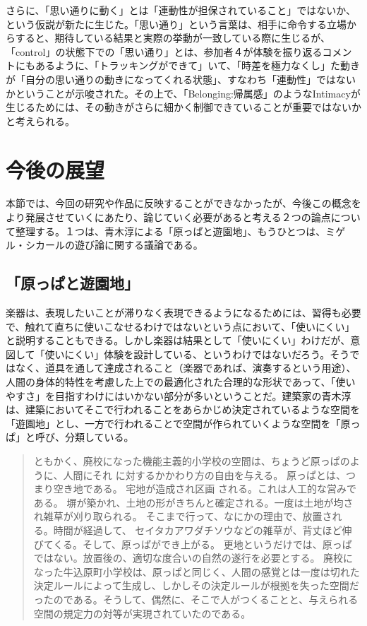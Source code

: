 さらに、「思い通りに動く」とは「連動性が担保されていること」ではないか、という仮説が新たに生じた。「思い通り」という言葉は、相手に命令する立場からすると、期待している結果と実際の挙動が一致している際に生じるが、「control」の状態下での「思い通り」とは、参加者４が体験を振り返るコメントにもあるように、「トラッキングができて」いて、「時差を極力なくし」た動きが「自分の思い通りの動きになってくれる状態」、すなわち「連動性」ではないかということが示唆された。その上で、「Belonging:帰属感」のようなIntimacyが生じるためには、その動きがさらに細かく制御できていることが重要ではないかと考えられる。

\section{今後の展望}
本節では、今回の研究や作品に反映することができなかったが、今後この概念をより発展させていくにあたり、論じていく必要があると考える２つの論点について整理する。１つは、青木淳による「原っぱと遊園地」、もうひとつは、ミゲル・シカールの遊び論に関する議論である。

\subsection{「原っぱと遊園地」}
楽器は、表現したいことが滞りなく表現できるようになるためには、習得も必要で、触れて直ちに使いこなせるわけではないという点において、「使いにくい」と説明することもできる。しかし楽器は結果として「使いにくい」わけだが、意図して「使いにくい」体験を設計している、というわけではないだろう。そうではなく、道具を通して達成されること（楽器であれば、演奏するという用途）、人間の身体的特性を考慮した上での最適化された合理的な形状であって、「使いやすさ」を目指すわけにはいかない部分が多いということだ。建築家の青木淳は、建築においてそこで行われることをあらかじめ決定されているような空間を「遊園地」とし、一方で行われることで空間が作られていくような空間を「原っぱ」と呼び、分類している。

\begin{quote}
  ともかく、廃校になった機能主義的小学校の空間は、ちょうど原っぱのように、人間にそれ に対するかかわり方の自由を与える。 原っぱとは、つまり空き地である。 宅地が造成され区画 される。これは人工的な営みである。 塀が築かれ、土地の形がきちんと確定される。一度は土地が均され雑草が刈り取られる。 そこまで行って、なにかの理由で、放置される。時間が経過して、 セイタカアワダチソウなどの雑草が、背丈ほど伸びてくる。そして、原っぱができ上がる。 更地というだけでは、原っぱではない。放置後の、適切な度合いの自然の遂行を必要とする。 
  廃校になった牛込原町小学校は、原っぱと同じく、人間の感覚とは一度は切れた決定ルールによって生成し、しかしその決定ルールが根拠を失った空間だったのである。そうして、偶然に、そこで人がつくることと、与えられる空間の規定力の対等が実現されていたのである。  
\end{quote}


